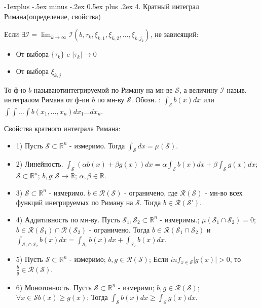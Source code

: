 \documentclass[unicode,10pt, landscape]{article}
\makeatletter
\renewcommand{\subsection}{\@startsection{subsection}{2}{0mm}%
                                {-1explus -.5ex minus -.2ex}%
                                {0.5ex plus .2ex}%
                                {\normalfont\normalsize\bfseries}}
\makeatother
\begin{document}
\begin{multicols}{4}
 \subsection{4. Кратный интеграл Римана(определение, свойства)}
 \begin{Def}
  Если $\exists \mathcal{I} = \lim_{k \to \infty} \mathcal{I}(b, \tau_k, \xi_{k,1}, \xi_{k,2}, \ldots, \xi_{k, j_k})$, не зависящий:
  \begin{itemize}
   \item От выбора $\{\tau_k\}$ c $|\tau_k| \to 0$
   \item От выбора $\xi_{k, j}$
  \end{itemize}
  То ф-ю $b$ называютинтегрируемой по Риману на мн-ве $\mathcal{S}$, а величину $\mathcal{I}$ назыв. интегралом Римана от ф-ии $b$ по мн-ву $\mathcal{S}$.
  Обозн. : $\int_{\mathcal{S}}b(x)dx$ или $\int\int\ldots\int b(x_1, \ldots, x_n) dx_1\ldots dx_n$.
 \end{Def}
 Свойства кратного интеграла Римана:
 \begin{itemize}
  \item 1) Пусть $\mathcal{S} \subset \mathbb{R}^n$ - измеримо. Тогда $\int_{\mathcal{S}}dx = \mu(\mathcal{S})$.
  \item 2) Линейность. $\int_{\mathcal{S}}(\alpha b(x) + \beta g(x))dx = \alpha\int_\mathcal{S}b(x)dx + \beta\int_\mathcal{S}g(x)dx$; $\mathcal{S} \subset \mathbb{R}^n$; $b,g: \mathcal{S} \to \mathbb{R}$; $\alpha, \beta \in \mathbb{R}$.
  \item 3) $\mathcal{S} \subset \mathbb{R}^n$ - измеримо. $b \in \mathcal{R}(\mathcal{S})$ - ограничено, где $\mathcal{R}(\mathcal{S})$ - мн-во всех функций инегрируемых по Риману на $\mathcal{S}$. Тогда $b \in \mathcal{R}(\mathcal{S}')$.
  \item 4) Аддитивность по мн-ву. Пусть $\mathcal{S}_1, \mathcal{S}_2 \subset \mathbb{R}^n$ - измеримы.; $\mu(\mathcal{S}_1 \cap \mathcal{S}_2) = 0$; $b \in \mathcal{R}(\mathcal{S}_1) \cap \mathcal{R}(\mathcal{S}_2)$ - ограничено. Тогда $b \in \mathcal{R}(\mathcal{S}_1 \cap \mathcal{S}_2)$ и $\int_{\mathcal{S}_1 \cap \mathcal{S}_2}b(x)dx = \int_{\mathcal{S}_1}b(x)dx + \int_{\mathcal{S}_2}b(x)dx$.
  \item 5) Пусть $\mathcal{S} \subset \mathbb{R}^n$ - измеримо; $b, g \in \mathcal{R}(\mathcal{S})$; Если $inf_{x \in \mathcal{S}} |g(x)| > 0$, то $\frac{b}{g} \in \mathcal{R}(\mathcal{S})$.
  \item 6) Монотонность. Пусть $\mathcal{S} \subset \mathbb{R}^n$ - измеримо; $b, g \in \mathcal{R}(\mathcal{S})$; $\forall x \in \mathcal{S}  b(x) \geq g(x)$; Тогда $\int_\mathcal{S}b(x)dx \geq \int_\mathcal{S}g(x)dx$.

\end{itemize}
\end{multicols}
\end{document}
